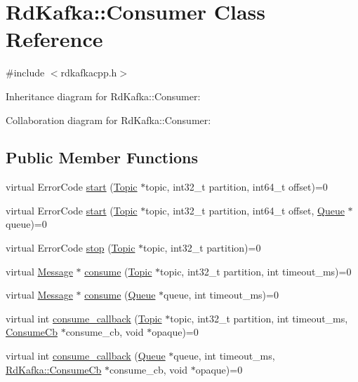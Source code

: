 \hypertarget{classRdKafka_1_1Consumer}{\section{Rd\-Kafka\-:\-:Consumer Class Reference}
\label{classRdKafka_1_1Consumer}
}


{\ttfamily \#include $<$rdkafkacpp.\-h$>$}



Inheritance diagram for Rd\-Kafka\-:\-:Consumer\-:


Collaboration diagram for Rd\-Kafka\-:\-:Consumer\-:
\subsection*{Public Member Functions}
\begin{DoxyCompactItemize}
\item 
virtual Error\-Code \hyperlink{classRdKafka_1_1Consumer_ad2044e3433f626baff667e1a429d6f33}{start} (\hyperlink{classRdKafka_1_1Topic}{Topic} $\ast$topic, int32\-\_\-t partition, int64\-\_\-t offset)=0
\item 
virtual Error\-Code \hyperlink{classRdKafka_1_1Consumer_a096b4f201fef44fe4607a9b0b907a229}{start} (\hyperlink{classRdKafka_1_1Topic}{Topic} $\ast$topic, int32\-\_\-t partition, int64\-\_\-t offset, \hyperlink{classRdKafka_1_1Queue}{Queue} $\ast$queue)=0
\item 
virtual Error\-Code \hyperlink{classRdKafka_1_1Consumer_a123ce138ca526ee1e5fafff09f14602b}{stop} (\hyperlink{classRdKafka_1_1Topic}{Topic} $\ast$topic, int32\-\_\-t partition)=0
\item 
virtual \hyperlink{classRdKafka_1_1Message}{Message} $\ast$ \hyperlink{classRdKafka_1_1Consumer_a0afd32e342283fc10fa6f32cc25950b7}{consume} (\hyperlink{classRdKafka_1_1Topic}{Topic} $\ast$topic, int32\-\_\-t partition, int timeout\-\_\-ms)=0
\item 
virtual \hyperlink{classRdKafka_1_1Message}{Message} $\ast$ \hyperlink{classRdKafka_1_1Consumer_a2393e5cc720f1e08231037af9e4b6ac5}{consume} (\hyperlink{classRdKafka_1_1Queue}{Queue} $\ast$queue, int timeout\-\_\-ms)=0
\item 
virtual int \hyperlink{classRdKafka_1_1Consumer_a15a3e64a1ed777804df8b4ea02a40887}{consume\-\_\-callback} (\hyperlink{classRdKafka_1_1Topic}{Topic} $\ast$topic, int32\-\_\-t partition, int timeout\-\_\-ms, \hyperlink{classRdKafka_1_1ConsumeCb}{Consume\-Cb} $\ast$consume\-\_\-cb, void $\ast$opaque)=0
\item 
virtual int \hyperlink{classRdKafka_1_1Consumer_a992d17b68c36e500cfa7332c23d112ba}{consume\-\_\-callback} (\hyperlink{classRdKafka_1_1Queue}{Queue} $\ast$queue, int timeout\-\_\-ms, \hyperlink{classRdKafka_1_1ConsumeCb}{Rd\-Kafka\-::\-Consume\-Cb} $\ast$consume\-\_\-cb, void $\ast$opaque)=0
\end{DoxyCompactItemize}
